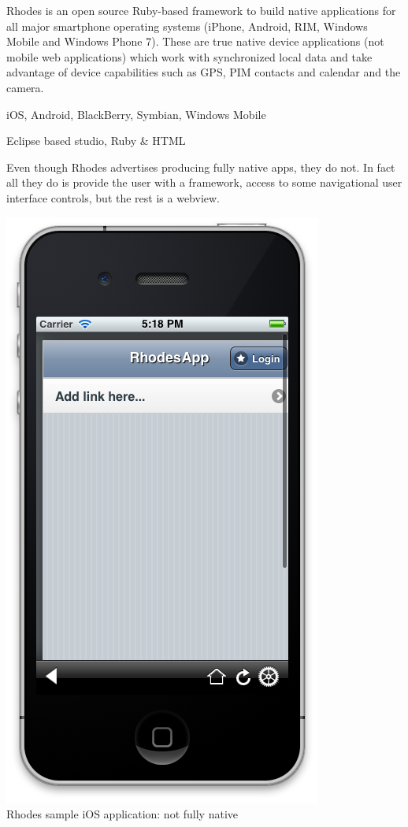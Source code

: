 


Rhodes is an open source Ruby-based framework to build native applications for all major smartphone operating systems (iPhone, Android, RIM, Windows Mobile and Windows Phone 7). These are true native device applications (not mobile web applications) which work with synchronized local data and take advantage of device capabilities such as GPS, PIM contacts and calendar and the camera. %

iOS, Android, BlackBerry, Symbian, Windows Mobile

Eclipse based studio, Ruby \& HTML

Even though Rhodes advertises producing fully native apps\cite{RhoMobile}, they do not. In fact all they do is provide the user with a framework, access to some navigational user interface controls, but the rest is a webview.
\begin{centering}
	\includegraphics[scale=0.3]{images/rhodes_notsonative.png}\\{Rhodes sample iOS application: not fully native}\\
\end{centering}

